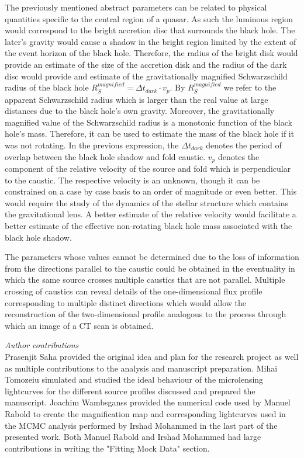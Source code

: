 \documentclass[usenatbib]{mn2e}
\begin{document}
The previously mentioned abstract parameters can be related to
physical quantities specific to the central region of a quasar.  As
such the luminous region would correspond to the bright accretion disc
that surrounds the black hole. The later's gravity would cause a
shadow in the bright region limited by the extent of the event horizon
of the black hole. Therefore, the radius of the bright disk would
provide an estimate of the size of the accretion disk and the radius
of the dark disc would provide and estimate of the gravitationally
magnified Schwarzschild radius of the black hole $R_{S}^{magnified} =
\Delta t_{dark} \cdot v_p$.  By $R_{S}^{magnified}$ we refer to the
apparent Schwarzschild radius which is larger than the real value at
large distances due to the black hole's own gravity.  Moreover, the
gravitationally magnified value of the Schwarzschild radius is a
monotonic function of the black hole's mass. Therefore, it can be used
to estimate the mass of the black hole if it was not rotating. In the
previous expression, the $\Delta t_{dark}$ denotes the period of
overlap between the black hole shadow and fold caustic.  $v_p$ denotes
the component of the relative velocity of the source and fold which is
perpendicular to the caustic.  The respective velocity is an unknown,
though it can be constrained on a case by case basis to an order of
magnitude or even better. This would require the study of the dynamics
of the stellar structure which contains the gravitational lens.  A
better estimate of the relative velocity would facilitate a better
estimate of the effective non-rotating black hole mass associated with
the black hole shadow.

    
The parameters whose values cannot be determined due to the loss of information from the directions parallel to the 
caustic could be obtained in the eventuality in which the same source crosses multiple caustics that are not parallel. 
Multiple crossing of caustics can reveal details of the one-dimensional flux profile corresponding to multiple distinct 
directions which would allow the reconstruction of the two-dimensional profile analogous to the process through which an image of a CT scan is obtained.  

\textit{Author contributions}\\
Prasenjit Saha provided the original idea and plan for the research project as well as multiple contributions to the analysis and manuscript preparation. Mihai Tomozeiu simulated and studied the ideal behaviour of the microlensing lightcurves for the different source profiles discussed and prepared the manuscript.
 Joachim Wambsganss provided the numerical code used by Manuel Rabold to create the magnification map and corresponding lightcurves 
used in the MCMC analysis performed by Irshad Mohammed in the last part of the presented work. Both Manuel Rabold and Irshad Mohammed had large contributions in writing the "Fitting Mock Data" section.
\end{document}
